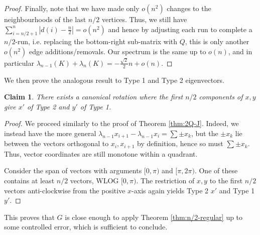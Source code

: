 \documentclass[11pt]{article}
\newtheorem{clm}[thm]{Claim}
\begin{document}
\begin{proof}
    Finally, note that we have made only $o(n^2)$ changes to the neighbourhoods of the last $n/2$ vertices. Thus, we still have $\sum_{i = n/2+1}^{n} |d(i) - \frac{n}{2}| = o(n^2)$ and hence by adjusting each run to complete a $n/2$-run, i.e. replacing the bottom-right sub-matrix with $Q$, this is only another $o(n^2)$ edge additions/removals. Our spectrum is the same up to $o(n)$, and in particular $\lambda_{n-1}(K) + \lambda_n(K) = -\frac{\sqrt{2}}{2} n + o(n)$. 
\end{proof}

We then prove the analogous result to Type 1 and Type 2 eigenvectors. 

\begin{clm}\label{clm:close-type}
    There exists a canonical rotation where the first $n/2$ components of $x, y$ give $x'$ of Type 2 and $y'$ of Type 1. 
\end{clm}
\begin{proof}
    We proceed similarly to the proof of Theorem \ref{thm:2Q-J}. Indeed, we instead have the more general $\lambda_{n-1} x_{i+1} - \lambda_{n-1} x_i = \sum \pm x_k$, but the $\pm x_k$ lie between the vectors orthogonal to $x_i, x_{i+1}$ by definition, hence so must $\sum \pm x_k$. Thus, vector coordinates are still monotone within a quadrant. 

    Consider the span of vectors with arguments $[0, \pi)$ and $[\pi, 2\pi)$. One of these contains at least $n/2$ vectors, WLOG $[0, \pi)$. The restriction of $x, y$ to the first $n/2$ vectors anti-clockwise from the positive $x$-axis again yields Type 2 $x'$ and Type 1 $y'$.
\end{proof}

This proves that $G$ is close enough to apply Theorem \ref{thm:n/2-regular} up to some controlled error, which is sufficient to conclude. 
\end{document}
